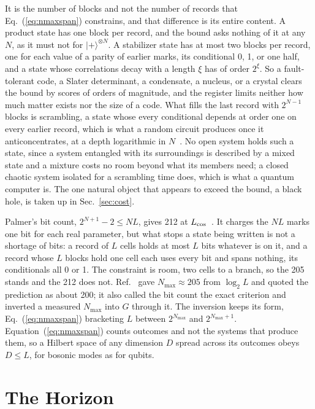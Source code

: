 \documentclass[aps,prd,twocolumn,superscriptaddress,nofootinbib]{revtex4-2}
\begin{document}
It is the number of blocks and not the number of records that Eq.~(\ref{eq:nmaxspan}) constrains, and that difference is its entire content. A product state has one block per record, and the bound asks nothing of it at any $N$, as it must not for $|{+}\rangle^{\otimes N}$. A stabilizer state has at most two blocks per record, one for each value of a parity of earlier marks, its conditional 0, 1, or one half, and a state whose correlations decay with a length $\xi$ has of order $2^{\xi}$. So a fault-tolerant code, a Slater determinant, a condensate, a nucleus, or a crystal clears the bound by scores of orders of magnitude, and the register limits neither how much matter exists nor the size of a code. What fills the last record with $2^{N-1}$ blocks is scrambling, a state whose every conditional depends at order one on every earlier record, which is what a random circuit produces once it anticoncentrates, at a depth logarithmic in $N$~\cite{dalzell2022}. No open system holds such a state, since a system entangled with its surroundings is described by a mixed state and a mixture costs no room beyond what its members need; a closed chaotic system isolated for a scrambling time does, which is what a quantum computer is. The one natural object that appears to exceed the bound, a black hole, is taken up in Sec.~\ref{sec:cost}.

Palmer's bit count, $2^{N+1}-2 \le NL$, gives 212 at $L_{\rm cos}$~\cite{palmer2026c}. It charges the $NL$ marks one bit for each real parameter, but what stops a state being written is not a shortage of bits: a record of $L$ cells holds at most $L$ bits whatever is on it, and a record whose $L$ blocks hold one cell each uses every bit and spans nothing, its conditionals all 0 or 1. The constraint is room, two cells to a branch, so the 205 stands and the 212 does not. Ref.~\cite{korytko2026} gave $N_{\max}\approx205$ from $\log_2 L$ and quoted the prediction as about 200; it also called the bit count the exact criterion and inverted a measured $N_{\max}$ into $G$ through it. The inversion keeps its form, Eq.~(\ref{eq:nmaxspan}) bracketing $L$ between $2^{N_{\max}}$ and $2^{N_{\max}+1}$. Equation~(\ref{eq:nmaxspan}) counts outcomes and not the systems that produce them, so a Hilbert space of any dimension $D$ spread across its outcomes obeys $D \le L$, for bosonic modes as for qubits.

\section{The Horizon}
\label{sec:horizon}
\end{document}
